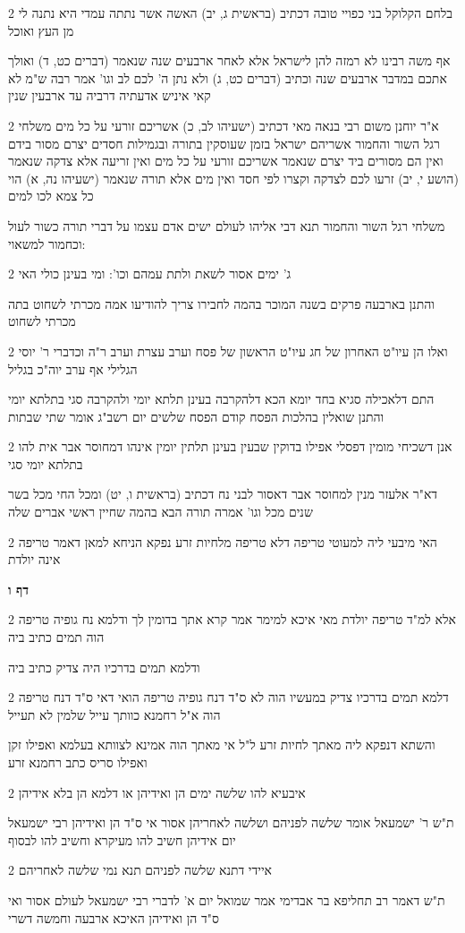 \documentclass[12pt, openany]{book}
\newcommand{\sethebfont}{
\fontsize{10.5pt}{21.0pt} \selectfont
}
\newcommand{\twocol}[1]{
	{\sethebfont \begin{multicols}{2}
			#1
	\end{multicols}}	
}
\newcommand{\sectname}{}
\newcommand{\newsection}[1]{
	\addcontentsline{toc}{section}{#1}
	\renewcommand{\sectname}{#1}	
	\vspace{-\baselineskip}
	\begin{center}
		\textbf{%
\fontsize{16pt}{16pt}\selectfont
			#1}
	\end{center}
	\vspace{-\baselineskip}
	\nopagebreak
}
\begin{document}
\twocol{בלחם הקלוקל בני כפויי טובה דכתיב (בראשית ג, יב) האשה אשר נתתה עמדי היא נתנה לי מן העץ ואוכל
\par אף משה רבינו לא רמזה להן לישראל אלא לאחר ארבעים שנה שנאמר (דברים כט, ד) ואולך אתכם במדבר ארבעים שנה וכתיב (דברים כט, ג) ולא נתן ה' לכם לב וגו' אמר רבה ש"מ לא קאי איניש אדעתיה דרביה עד ארבעין שנין}
\twocol{א"ר יוחנן משום רבי בנאה מאי דכתיב (ישעיהו לב, כ) אשריכם זורעי על כל מים משלחי רגל השור והחמור אשריהם ישראל בזמן שעוסקין בתורה ובגמילות חסדים יצרם מסור בידם ואין הם מסורים ביד יצרם שנאמר אשריכם זורעי על כל מים ואין זריעה אלא צדקה שנאמר (הושע י, יב) זרעו לכם לצדקה וקצרו לפי חסד ואין מים אלא תורה שנאמר (ישעיהו נה, א) הוי כל צמא לכו למים
\par משלחי רגל השור והחמור תנא דבי אליהו לעולם ישים אדם עצמו על דברי תורה כשור לעול וכחמור למשאוי:}
\twocol{ג' ימים אסור לשאת ולתת עמהם וכו': ומי בעינן כולי האי
\par והתנן בארבעה פרקים בשנה המוכר בהמה לחבירו צריך להודיעו אמה מכרתי לשחוט בתה מכרתי לשחוט}
\twocol{ואלו הן עיו"ט האחרון של חג עיו"ט הראשון של פסח וערב עצרת וערב ר"ה וכדברי ר' יוסי הגלילי אף ערב יוה"כ בגליל
\par התם דלאכילה סגיא בחד יומא הכא דלהקרבה בעינן תלתא יומי ולהקרבה סגי בתלתא יומי והתנן שואלין בהלכות הפסח קודם הפסח שלשים יום רשב"ג אומר שתי שבתות}
\twocol{אנן דשכיחי מומין דפסלי אפילו בדוקין שבעין בעינן תלתין יומין אינהו דמחוסר אבר אית להו בתלתא יומי סגי
\par דא"ר אלעזר מנין למחוסר אבר דאסור לבני נח דכתיב (בראשית ו, יט) ומכל החי מכל בשר שנים מכל וגו' אמרה תורה הבא בהמה שחיין ראשי אברים שלה}
\twocol{האי מיבעי ליה למעוטי טריפה דלא טריפה מלחיות זרע נפקא הניחא למאן דאמר טריפה אינה יולדת}
\newsection{דף ו}
\twocol{אלא למ"ד טריפה יולדת מאי איכא למימר אמר קרא אתך בדומין לך ודלמא נח גופיה טריפה הוה תמים כתיב ביה
\par ודלמא תמים בדרכיו היה צדיק כתיב ביה}
\twocol{דלמא תמים בדרכיו צדיק במעשיו הוה לא ס"ד דנח גופיה טריפה הואי דאי ס"ד דנח טריפה הוה א"ל רחמנא כוותך עייל שלמין לא תעייל
\par והשתא דנפקא ליה מאתך לחיות זרע ל"ל אי מאתך הוה אמינא לצוותא בעלמא ואפילו זקן ואפילו סריס כתב רחמנא זרע}
\twocol{איבעיא להו שלשה ימים הן ואידיהן או דלמא הן בלא אידיהן
\par ת"ש ר' ישמעאל אומר שלשה לפניהם ושלשה לאחריהן אסור אי ס"ד הן ואידיהן רבי ישמעאל יום אידיהן חשיב להו מעיקרא וחשיב להו לבסוף}
\twocol{איידי דתנא שלשה לפניהם תנא נמי שלשה לאחריהם
\par ת"ש דאמר רב תחליפא בר אבדימי אמר שמואל יום א' לדברי רבי ישמעאל לעולם אסור ואי ס"ד הן ואידיהן האיכא ארבעה וחמשה דשרי}
\end{document}
